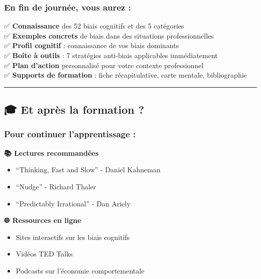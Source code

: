 \documentclass[
]{article}
\providecommand{\tightlist}{%
  \setlength{\itemsep}{0pt}\setlength{\parskip}{0pt}}
\begin{document}
\subsubsection{\texorpdfstring{\textbf{En fin de journée, vous aurez
:}}{En fin de journée, vous aurez :}}\label{en-fin-de-journuxe9e-vous-aurez}

✅ \textbf{Connaissance} des 52 biais cognitifs et des 5 catégories\\
✅ \textbf{Exemples concrets} de biais dans des situations
professionnelles\\
✅ \textbf{Profil cognitif} : connaissance de vos biais dominants\\
✅ \textbf{Boîte à outils} : 7 stratégies anti-biais applicables
immédiatement\\
✅ \textbf{Plan d'action} personnalisé pour votre contexte
professionnel\\
✅ \textbf{Supports de formation} : fiche récapitulative, carte mentale,
bibliographie

\begin{center}\rule{0.5\linewidth}{0.5pt}\end{center}

\subsection{🎓 Et après la formation ?}\label{et-apruxe8s-la-formation}

\subsubsection{\texorpdfstring{\textbf{Pour continuer l'apprentissage
:}}{Pour continuer l'apprentissage :}}\label{pour-continuer-lapprentissage}

\textbf{📚 Lectures recommandées}

\begin{itemize}
\tightlist
\item
  ``Thinking, Fast and Slow'' - Daniel Kahneman
\item
  ``Nudge'' - Richard Thaler
\item
  ``Predictably Irrational'' - Dan Ariely
\end{itemize}

\textbf{🌐 Ressources en ligne}

\begin{itemize}
\tightlist
\item
  Sites interactifs sur les biais cognitifs
\item
  Vidéos TED Talks
\item
  Podcasts sur l'économie comportementale
\end{itemize}
\end{document}
